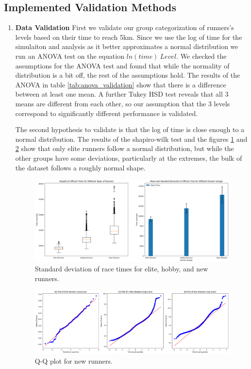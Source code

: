 \documentclass[conference]{IEEEtran}
\begin{document}
\subsection{Implemented Validation Methods}
\begin{enumerate}
    \item \textbf{Data Validation}
    First we validate our group categorization of runners's levels based on their time to reach 5km. Since we use the log of time for the simulaiton and analysis as it better approximates a normal distribution we run an ANOVA test on the equation $ln(time) ~ Level$. We checked the assumptions for the ANOVA test and found that while the normality of distribution is a bit off, the rest of the assumptions hold. The results of the ANOVA in table \ref{tab:anova_validation} show that there is a difference between at least one mean. A further Tukey HSD test reveals that all 3 means are different from each other, so our assumption that the 3 levels correspond to significantly different performance is validated.

    The second hypothesis to validate is that the log of time is close enough to a normal distribution. The results of the shapiro-wilk test and the  figures \ref{fig:elite_hobby_new_standar_deviation} and \ref{fig:new_qq} show that only elite runners follow a normal distribution, but while the other groups have some deviations, particularly at the extremes, the bulk of the dataset follows a roughly normal shape.

    \begin{figure}[htbp]
        \centerline{\includegraphics[width=\linewidth]{figs/elite_hobby_new_standar_deviation.png}}
        \caption{Standard deviation of race times for elite, hobby, and new runners.}
        \label{fig:elite_hobby_new_standar_deviation}
    \end{figure}
    
    \begin{figure}[htbp]
        \centerline{\includegraphics[width=\linewidth]{figs/elite_hobby_new_qq.png}}
        \caption{Q-Q plot for new runners.}
        \label{fig:new_qq}
    \end{figure}


\end{enumerate}
\end{document}
